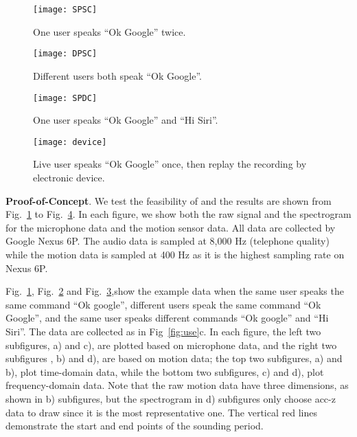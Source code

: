 
\begin{figure}[h]
	\centering
	\texttt{[image: SPSC]}
	\caption{One user speaks ``Ok Google'' twice.}
	\label{fig:SPSC}
\end{figure}
\begin{figure}[h]
	\centering
	\texttt{[image: DPSC]}
	\caption{Different users both speak ``Ok Google''.}
	\label{fig:DPSC}
\end{figure}
\begin{figure}[h]
	\centering
	\texttt{[image: SPDC]}
	\caption{One user speaks ``Ok Google'' and ``Hi Siri''.}
	\label{fig:SPDC}
\end{figure}
\begin{figure}[h]
	\centering
	\texttt{[image: device]}
	\caption{Live user speaks ``Ok Google'' once, then replay the recording by electronic device.}
	\label{fig:device}
\end{figure}




\textbf{Proof-of-Concept}.
We test the feasibility of {\shortname} and the results are shown from Fig.~\ref{fig:SPSC} to Fig.~\ref{fig:device}. In each figure, we show both the raw signal and the spectrogram for the microphone data and the motion sensor data. All data are collected by Google Nexus 6P. The audio data is sampled at  8,000 Hz (telephone quality) while the motion data is sampled at 400 Hz as it is the highest sampling rate on Nexus 6P.


Fig.~\ref{fig:SPSC}, Fig.~\ref{fig:DPSC}  and  Fig.~\ref{fig:SPDC},show the example data when the same user speaks the same command ``Ok google'', different users speak the same command ``Ok Google'', and the same user speaks different commands ``Ok google'' and ``Hi Siri''. The data are collected as in Fig~\ref{fig:use}c.  In each figure, the left two subfigures, a) and c), are plotted based on microphone data, and the right two subfigures , b) and d),  are based on motion data; the top two subfigures, a) and b), plot time-domain data, while the bottom  two subfigures, c) and d), plot frequency-domain data. Note that the raw motion data have three dimensions, as shown in b) subfigures, but the spectrogram in d) subfigures only choose acc-z data to draw since it is the most representative one. The vertical red lines demonstrate the start and end points of the sounding period.


